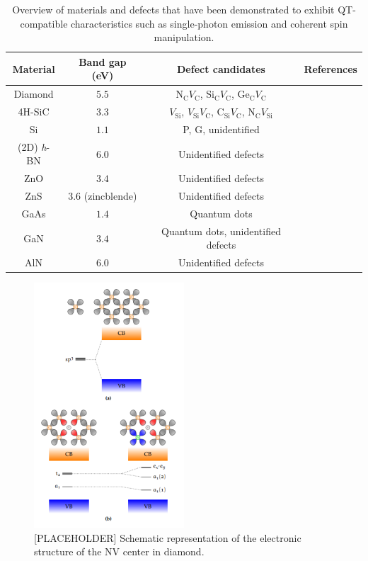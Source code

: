 \documentclass[superscriptaddress,unsortedaddress,
 amsmath,amssymb,
 aps,
]{revtex4-2}
\begin{document}
\begin{table}[h]
    \centering
    \begin{tabular}{c|c|c|c}
    Material & Band gap (eV) & Defect candidates & References \\
    \hline
    Diamond  & $5.5$  & N$_\mathrm{C}V_\mathrm{C}$, Si$_\mathrm{C}V_\mathrm{C}$, Ge$_\mathrm{C}V_\mathrm{C}$ & \cite{Balasubramanian_2009,Rogers_2014,Bhaskar_2018} \\  
    4H-SiC & $3.3$ & $V_\mathrm{Si}$, $V_\mathrm{Si}V_\mathrm{C}$, C$_\mathrm{Si}V_\mathrm{C}$, N$_\mathrm{C}V_\mathrm{Si}$ & \cite{Widmann2014,Christle_2015,Castelletto_2014,Zargaleh_2018} \\ 
    Si & $1.1$ & P, G, unidentified & \cite{Muhonen_2014,Durand_2020,Redjem2020} \\ 
    (2D) \textit{h}-BN & $6.0$ & Unidentified defects & \cite{Tran_2016,Tran_2016b,Hayee_2020} \\ 
    ZnO & $3.4$ & Unidentified defects & \cite{Morfa2012} \\ 
    ZnS & $3.6$ (zincblende) & Unidentified defects & \cite{Stewart2019} \\ 
    GaAs & $1.4$ & Quantum dots & \cite{Bluhm2010} \\ 
    GaN & $3.4$ & Quantum dots, unidentified defects & \cite{Roux2017,Berhane2018} \\
    AlN & $6.0$ & Unidentified defects & \cite{Xue2020}\\
    \end{tabular}
    \caption{Overview of materials and defects that have been demonstrated to exhibit QT-compatible characteristics such as single-photon emission and coherent spin manipulation.}
    \label{tab:qt-materials}
\end{table}

\begin{figure}[t]
    \centering
    \includegraphics[width=0.5\textwidth]{figures/NV.png}
    \caption{[PLACEHOLDER] Schematic representation of the electronic structure of the NV center in diamond.}
    \label{fig:defects-dft}
\end{figure}
\end{document}
